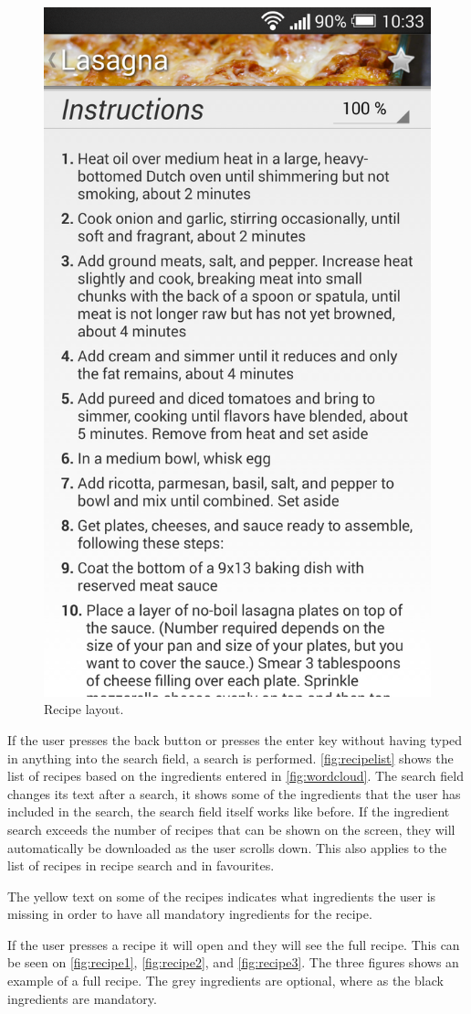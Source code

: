 \begin{figure}[H]
\begin{minipage}[t]{0.5\columnwidth}
\includegraphics[width=0.7\columnwidth]{img/screenshots/finalrecipe3.png}
\caption{Recipe layout\label{fig:recipe3}.}
\end{minipage}
\end{figure}
If the user presses the back button or presses the enter key without having typed in anything into the search field, a search is performed. \autoref{fig:recipelist} shows the list of recipes based on the ingredients entered in \autoref{fig:wordcloud}. The search field changes its text after a search, it shows some of the ingredients that the user has included in the search, the search field itself works like before. If the ingredient search exceeds the number of recipes that can be shown on the screen, they will automatically be downloaded as the user scrolls down. This also applies to the list of recipes in recipe search and in favourites.


The yellow text on some of the recipes indicates what ingredients the user is missing in order to have all mandatory ingredients for the recipe.

If the user presses a recipe it will open and they will see the full recipe. This can be seen on \autoref{fig:recipe1}, \autoref{fig:recipe2}, and \autoref{fig:recipe3}. The three figures shows an example of a full recipe. The grey ingredients are optional, where as the black ingredients are mandatory. 


